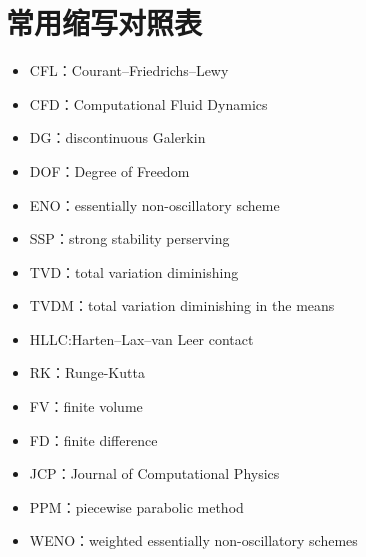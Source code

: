\documentclass{book}
\begin{document}
\section{常用缩写对照表}
\begin{itemize}
    \item CFL：Courant–Friedrichs–Lewy
    \item CFD：Computational Fluid Dynamics
    \item DG：discontinuous Galerkin
    \item DOF：Degree of Freedom
    \item ENO：essentially non-oscillatory scheme
    \item SSP：strong stability perserving
    \item TVD：total variation diminishing
    \item TVDM：total variation diminishing in the means
    \item HLLC:Harten–Lax–van Leer contact
    \item RK：Runge-Kutta
    \item FV：finite volume
    \item FD：finite difference
    \item JCP：Journal of Computational Physics
    \item PPM：piecewise parabolic method
    \item WENO：weighted essentially non-oscillatory schemes
\end{itemize}


\end{document}
